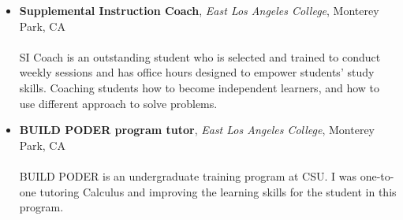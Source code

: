 \documentclass{article}
\begin{document}
	\noindent
	\begin{minipage}[t]{0.5\textwidth}
		
		\begin{itemize}[leftmargin=*]
			\item[]
			\textbf{Supplemental Instruction Coach}, \textit{East Los Angeles College}, Monterey Park, CA \\
			 \\
			SI Coach is an outstanding student who is selected and trained to conduct weekly sessions and has office hours designed to empower students' study skills. Coaching students how to become independent learners, and how to use different approach to solve problems.
			
			\item[] 
			\textbf{BUILD PODER program tutor}, \textit{East Los Angeles College}, Monterey Park, CA \\
			 \\
			BUILD PODER is an undergraduate training program at CSU. I was one-to-one tutoring Calculus and improving the learning skills for the student in this program.
		\end{itemize}
	\end{minipage}\hspace{0.3in}  %
\end{document}
